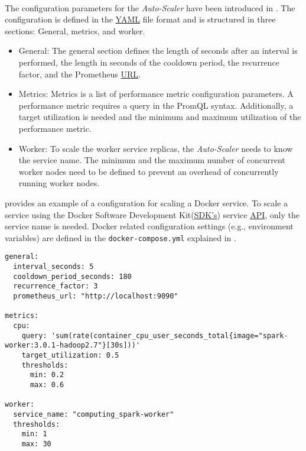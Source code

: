 \paragraph{}
The configuration parameters for the \textit{Auto-Scaler} have been introduced in .
The configuration is defined in the \hyperlink{abbr:yaml}{YAML} file format and is structured in three sections: General, metrics, and worker.
\begin{itemize}
\item General:
The general section defines the length of seconds after an interval is performed, the length in seconds of the cooldown period, the recurrence factor, and the Prometheus \hyperlink{abbr:url}{URL}.

\item Metrics:
Metrics is a list of performance metric configuration parameters. A performance metric requires a query in the PromQL syntax. Additionally, a target utilization is needed and the minimum and maximum utilization of the performance metric.

\item Worker:
To scale the worker service replicas, the \textit{Auto-Scaler} needs to know the service name. The minimum and the maximum number of concurrent worker nodes need to be defined to prevent an overhead of concurrently running worker nodes.
\end{itemize}
 provides an example of a configuration for scaling a Docker service.
%
To scale a service using the Docker Software Development Kit(\hyperlink{abbr:sdk}{SDK's}) service \hyperlink{abbr:api}{API}, only the service name is needed.
%
Docker related configuration settings (e.g., environment variables) are defined in the \texttt{docker-compose.yml} explained in .
\begin{lstlisting}[label=lst:06_auto-scaler_config_service_example, caption=\textit{Auto-Scaler} configuration for scaling Docker Services]
general:
  interval_seconds: 5
  cooldown_period_seconds: 180
  recurrence_factor: 3
  prometheus_url: "http://localhost:9090"
 
metrics:
  cpu:
    query: 'sum(rate(container_cpu_user_seconds_total{image="spark-worker:3.0.1-hadoop2.7"}[30s]))'
    target_utilization: 0.5
    thresholds:
      min: 0.2
      max: 0.6
 
worker:
  service_name: "computing_spark-worker"
  thresholds:
    min: 1
    max: 30
\end{lstlisting}


